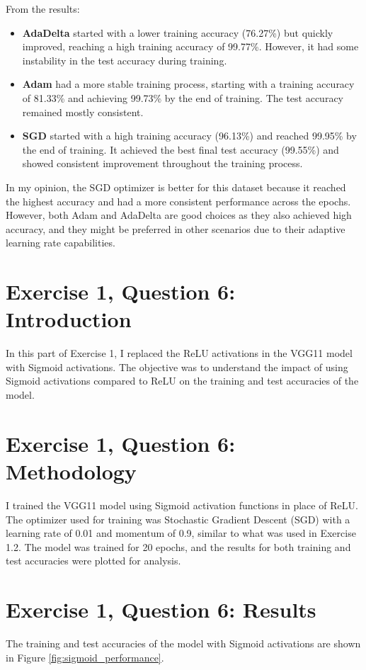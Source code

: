 \documentclass[10pt,letter,notitlepage]{article}
\begin{document}
\begin{center}
From the results:
\begin{itemize}
    \item 	\textbf{AdaDelta} started with a lower training accuracy (76.27\%) but quickly improved, reaching a high training accuracy of 99.77\%. However, it had some instability in the test accuracy during training.
    \item 	\textbf{Adam} had a more stable training process, starting with a training accuracy of 81.33\% and achieving 99.73\% by the end of training. The test accuracy remained mostly consistent.
    \item 	\textbf{SGD} started with a high training accuracy (96.13\%) and reached 99.95\% by the end of training. It achieved the best final test accuracy (99.55\%) and showed consistent improvement throughout the training process.
\end{itemize}

In my opinion, the SGD optimizer is better for this dataset because it reached the highest accuracy and had a more consistent performance across the epochs. However, both Adam and AdaDelta are good choices as they also achieved high accuracy, and they might be preferred in other scenarios due to their adaptive learning rate capabilities.

\section{Exercise 1, Question 6: Introduction}
In this part of Exercise 1, I replaced the ReLU activations in the VGG11 model with Sigmoid activations. The objective was to understand the impact of using Sigmoid activations compared to ReLU on the training and test accuracies of the model.

\section{Exercise 1, Question 6: Methodology}
I trained the VGG11 model using Sigmoid activation functions in place of ReLU. The optimizer used for training was Stochastic Gradient Descent (SGD) with a learning rate of 0.01 and momentum of 0.9, similar to what was used in Exercise 1.2. The model was trained for 20 epochs, and the results for both training and test accuracies were plotted for analysis.

\section{Exercise 1, Question 6: Results}
The training and test accuracies of the model with Sigmoid activations are shown in Figure \ref{fig:sigmoid_performance}.


\end{center}
\end{document}

